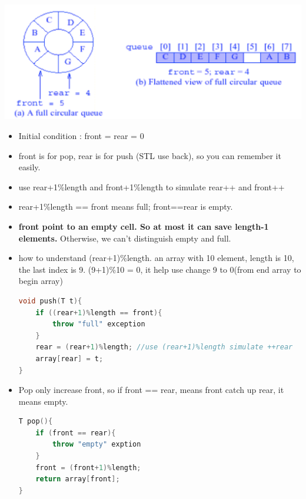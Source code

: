 \documentclass[a4paper,11pt,twoside]{book}
\begin{document}
\begin{center}
	\includegraphics[scale=0.35]{pics/cd.png} 
\end{center}

\begin{itemize}
\item Initial condition : front = rear = 0

\item front is for pop, rear is for push (STL use back), so you can remember it easily.

\item use rear+1\%length and front+1\%length to simulate rear++ and front++

\item rear+1\%length == front means full;  front==rear is empty.

\item \textbf{front point to an empty cell. So at most it can save length-1 elements. } Otherwise, we can't distinguish empty and full.


\item how to understand (rear+1)\%length. an array with 10 element, length is 10, the last index is 9.  (9+1)\%10 = 0, it help use change 9 to 0(from end array to begin array)

\begin{lstlisting}[frame=single, language=c++]
void push(T t){
	if ((rear+1)%length == front){
		throw "full" exception
	}
	rear = (rear+1)%length; //use (rear+1)%length simulate ++rear
	array[rear] = t;
}	
\end{lstlisting}

\item Pop only increase front, so if front == rear, means front catch up rear, it means empty.
\begin{lstlisting}[frame=single, language=c++]
T pop(){
	if (front == rear){
		throw "empty" exption
	}
	front = (front+1)%length;
	return array[front];
}
\end{lstlisting}

\end{itemize}
\end{document}
